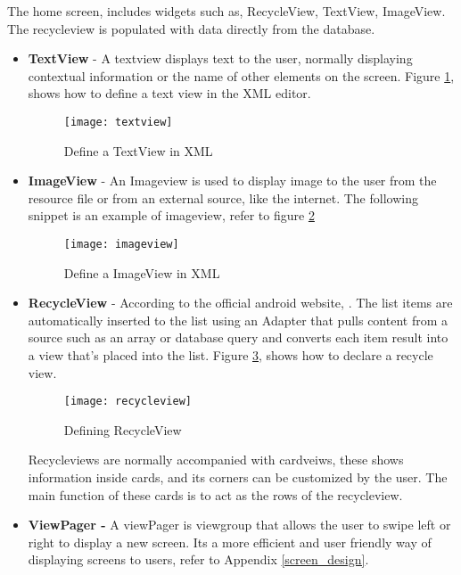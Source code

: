 The home screen, includes widgets such as, RecycleView, TextView, ImageView. The recycleview is populated with data directly from the database.
\begin{itemize}
	\item \textbf{TextView} - 
	A textview displays text to the user, normally displaying contextual information or the name of other elements on the screen. Figure \ref{fib:textview}, shows how to define a text view in the XML editor.	
\begin{figure}[!htbp]
		\centering
		\texttt{[image: textview]}	
		\caption{Define a TextView in XML}
		\label{fib:textview}
\end{figure}

\item \textbf{ImageView} - 
 	An Imageview is used to display image to the user from the resource file or from an external source, like the internet.	
 	The following snippet is an example of imageview, refer to figure \ref{fib:imageview}
 	
\begin{figure}[h]
 				\centering
 		\texttt{[image: imageview]}	
 		\caption{Define a ImageView in XML}
 		\label{fib:imageview}
\end{figure}
 \item \textbf{RecycleView} - 
According to the official android website, . The list items are automatically inserted to the list using an Adapter that pulls content from a source such as an array or database query and converts each item result into a view that's placed into the list.
Figure \ref{fig:xmlrecycleview}, shows how to declare a recycle view.
\begin{figure}[h]
	\centering       
		\texttt{[image: recycleview]}
		\caption{Defining RecycleView}
		\label{fig:xmlrecycleview}	
\end{figure} 

Recycleviews are normally accompanied with cardveiws, these shows information inside cards, and its corners can be customized by the user. The main function of these cards is to act as the rows of the recycleview.
	
\item \textbf{ViewPager - } 
A viewPager is viewgroup that allows the user to swipe left or right to display a new screen. Its a more efficient and user friendly way of displaying screens to users, refer to Appendix \ref{screen_design}.
\end{itemize} 
\pagebreak
